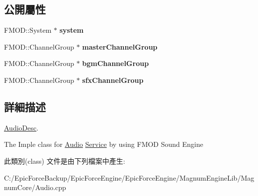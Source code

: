 \subsection*{公開屬性}
\begin{DoxyCompactItemize}
\item 
F\+M\+O\+D\+::\+System $\ast$ {\bfseries system}\hypertarget{class_magnum_1_1_audio_desc_ab2958ad18563ca1e046468b586299b1e}{}\label{class_magnum_1_1_audio_desc_ab2958ad18563ca1e046468b586299b1e}

\item 
F\+M\+O\+D\+::\+Channel\+Group $\ast$ {\bfseries master\+Channel\+Group}\hypertarget{class_magnum_1_1_audio_desc_a4fa0217311951903092ee72a24aecd68}{}\label{class_magnum_1_1_audio_desc_a4fa0217311951903092ee72a24aecd68}

\item 
F\+M\+O\+D\+::\+Channel\+Group $\ast$ {\bfseries bgm\+Channel\+Group}\hypertarget{class_magnum_1_1_audio_desc_ab3bcdb636fd826a917c5a825e1f4e350}{}\label{class_magnum_1_1_audio_desc_ab3bcdb636fd826a917c5a825e1f4e350}

\item 
F\+M\+O\+D\+::\+Channel\+Group $\ast$ {\bfseries sfx\+Channel\+Group}\hypertarget{class_magnum_1_1_audio_desc_a49e9945508dd55525f66a06d4a7164f2}{}\label{class_magnum_1_1_audio_desc_a49e9945508dd55525f66a06d4a7164f2}

\end{DoxyCompactItemize}


\subsection{詳細描述}
\hyperlink{class_magnum_1_1_audio_desc}{Audio\+Desc}. 

The Imple class for \hyperlink{class_magnum_1_1_audio}{Audio} \hyperlink{class_magnum_1_1_service}{Service} by using F\+M\+OD Sound Engine 

此類別(class) 文件是由下列檔案中產生\+:\begin{DoxyCompactItemize}
\item 
C\+:/\+Epic\+Force\+Backup/\+Epic\+Force\+Engine/\+Epic\+Force\+Engine/\+Magnum\+Engine\+Lib/\+Magnum\+Core/Audio.\+cpp\end{DoxyCompactItemize}
